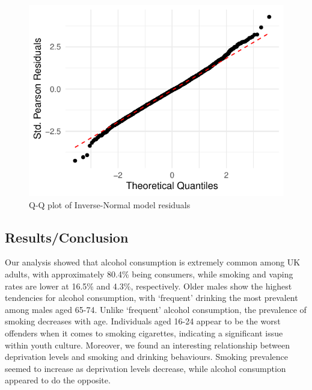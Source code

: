 \documentclass[
  11pt,
  twocolumn]{article}
\begin{document}
\begin{figure}[H]

{\centering \includegraphics{Coursework_files/figure-latex/output qq plot for q3-1} 

}

\caption{Q-Q plot of Inverse-Normal model residuals}\label{fig:output qq plot for q3}
\end{figure}

\hypertarget{resultsconclusion}{%
\subsection{Results/Conclusion}\label{resultsconclusion}}

Our analysis showed that alcohol consumption is extremely common among
UK adults, with approximately 80.4\% being consumers, while smoking and
vaping rates are lower at 16.5\% and 4.3\%, respectively. Older males
show the highest tendencies for alcohol consumption, with `frequent'
drinking the most prevalent among males aged 65-74. Unlike `frequent'
alcohol consumption, the prevalence of smoking decreases with age.
Individuals aged 16-24 appear to be the worst offenders when it comes to
smoking cigarettes, indicating a significant issue within youth culture.
Moreover, we found an interesting relationship between deprivation
levels and smoking and drinking behaviours. Smoking prevalence seemed to
increase as deprivation levels decrease, while alcohol consumption
appeared to do the opposite.
\end{document}
